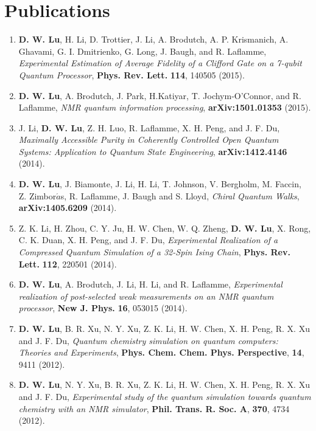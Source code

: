\documentclass[a4paper,10pt]{article}
\begin{document}
\section{Publications}
\medskip
\begin{enumerate}
\item \textbf{D. W. Lu}, H. Li, D. Trottier, J. Li, A. Brodutch, A. P. Krismanich, A. Ghavami, G. I. Dmitrienko, G. Long, J. Baugh, and R. Laflamme, {\it Experimental Estimation of Average Fidelity of a Clifford Gate on a 7-qubit Quantum Processor}, {\bf Phys. Rev. Lett.} \textbf{114}, 140505 (2015).

\item \textbf{D. W. Lu}, A. Brodutch, J. Park, H.Katiyar, T. Jochym-O'Connor, and R. Laflamme, {\it NMR quantum information processing},  {\bf arXiv:1501.01353} (2015).

\item J. Li, \textbf{D. W. Lu}, Z. H. Luo, R. Laflamme, X. H. Peng, and J. F. Du, {\it Maximally Accessible Purity in Coherently Controlled Open Quantum Systems: Application to Quantum State Engineering},  {\bf arXiv:1412.4146} (2014).

\item \textbf{D. W. Lu}, J. Biamonte, J. Li, H. Li, T. Johnson, V. Bergholm, M. Faccin, Z. Zimbor$\acute{a}$s, R. Laflamme, J. Baugh and S. Lloyd, {\it Chiral Quantum Walks},  {\bf arXiv:1405.6209} (2014).

\item Z. K. Li, H. Zhou, C. Y. Ju, H. W. Chen, W. Q. Zheng, \textbf{D. W. Lu}, X. Rong, C. K. Duan, X. H. Peng, and J. F. Du, {\it Experimental Realization of a Compressed Quantum Simulation of a 32-Spin Ising Chain}, {\bf Phys. Rev. Lett.} \textbf{112}, 220501 (2014).

\item \textbf{D. W. Lu}, A. Brodutch, J. Li, H. Li, and R. Laflamme, {\it Experimental realization of post-selected weak measurements on an NMR quantum processor}, {\bf New J. Phys.} \textbf{16}, 053015 (2014).

\item \textbf{D. W. Lu}, B. R. Xu, N. Y. Xu, Z. K. Li, H. W. Chen, X. H. Peng, R. X. Xu and J. F. Du, {\it Quantum chemistry simulation on quantum computers: Theories
and Experiments}, {\bf Phys. Chem. Chem. Phys. Perspective}, \textbf{14}, 9411 (2012).

\item \textbf{D. W. Lu}, N. Y. Xu, B. R. Xu, Z. K. Li, H. W. Chen, X. H. Peng, R. X. Xu and J. F. Du, {\it Experimental study of the quantum
simulation towards quantum chemistry with an NMR simulator},
{\bf Phil. Trans. R. Soc. A}, \textbf{370}, 4734 (2012).


\end{enumerate}
\end{document}
